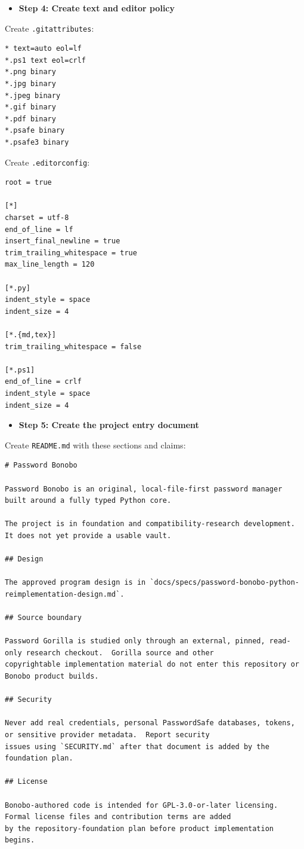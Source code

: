 \documentclass[
  letterpaper,
]{article}
\newcommand{\passthrough}[1]{#1}
\providecommand{\tightlist}{%
  \setlength{\itemsep}{0pt}\setlength{\parskip}{0pt}}
\begin{document}
\begin{itemize}
\tightlist
\item[$\boxtimes$]
  \textbf{Step 4: Create text and editor policy}
\end{itemize}

Create \nolinkurl{.gitattributes}:

\begin{lstlisting}
* text=auto eol=lf
*.ps1 text eol=crlf
*.png binary
*.jpg binary
*.jpeg binary
*.gif binary
*.pdf binary
*.psafe binary
*.psafe3 binary
\end{lstlisting}

Create \nolinkurl{.editorconfig}:

\begin{lstlisting}
root = true

[*]
charset = utf-8
end_of_line = lf
insert_final_newline = true
trim_trailing_whitespace = true
max_line_length = 120

[*.py]
indent_style = space
indent_size = 4

[*.{md,tex}]
trim_trailing_whitespace = false

[*.ps1]
end_of_line = crlf
indent_style = space
indent_size = 4
\end{lstlisting}

\begin{itemize}
\tightlist
\item[$\boxtimes$]
  \textbf{Step 5: Create the project entry document}
\end{itemize}

Create \passthrough{\lstinline!README.md!} with these sections and claims:

\begin{lstlisting}
# Password Bonobo

Password Bonobo is an original, local-file-first password manager built around a fully typed Python core.

The project is in foundation and compatibility-research development.  It does not yet provide a usable vault.

## Design

The approved program design is in `docs/specs/password-bonobo-python-reimplementation-design.md`.

## Source boundary

Password Gorilla is studied only through an external, pinned, read-only research checkout.  Gorilla source and other
copyrightable implementation material do not enter this repository or Bonobo product builds.

## Security

Never add real credentials, personal PasswordSafe databases, tokens, or sensitive provider metadata.  Report security
issues using `SECURITY.md` after that document is added by the foundation plan.

## License

Bonobo-authored code is intended for GPL-3.0-or-later licensing.  Formal license files and contribution terms are added
by the repository-foundation plan before product implementation begins.
\end{lstlisting}
\end{document}
